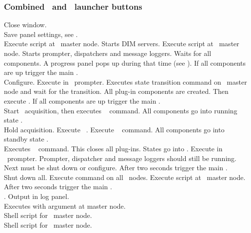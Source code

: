 {\subsubsection[Combined DABC and MBS launcher buttons]{Combined \dabc\ and \mbs\ launcher buttons}
 Close window.\\
 Save panel settings, see .\\
  Execute script  at \dabc\ master node.
Starts DIM servers.
Execute script  at \mbs\ master node.
Starts prompter, dispatchers and message loggers.
Waits for all components.
A progress panel pops up during that time
(see ).
If all components are up trigger the main .\\
 Configure. Execute  in \mbs\ prompter.
Executes state transition command 
on \dabc\ master node and wait for the transition.
All plug-in components are created. Then execute .
If all components are up trigger the main .\\
 Start \mbs\ acquisition, then executes \dabc\  command.
All components go into running state .\\
 Hold acquisition. Execute \mbs\ .
Execute \dabc\  command.
All components go into standby state .\\
 Executes \dabc\  command.
This closes all plug-ins. States go into . 
Execute  in \mbs\ prompter.
Prompter, dispatcher and message loggers should still be running.
Next must be shut down or configure.
After two seconds trigger the main .\\
 Shut down all. Execute  command on all \dabc\ nodes.
Execute script  at \mbs\ master node.
After two seconds trigger the main .\\
 . Output in log panel.\\
 Executes  with argument  at master node.\\
 Shell script for \mbs\ master node.\\
 Shell script for \dabc\ master node.
}
